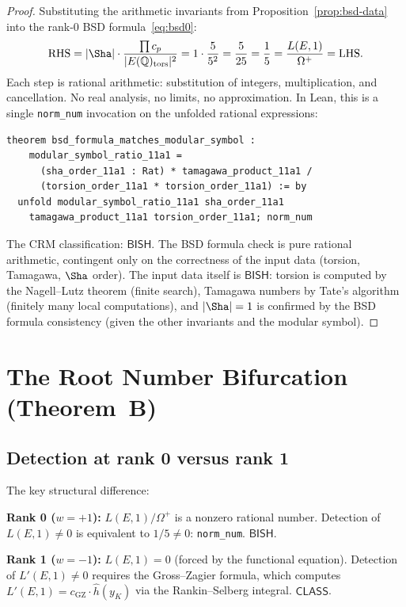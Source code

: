 \documentclass[11pt]{article}
\theoremstyle{plain}
\theoremstyle{definition}
\theoremstyle{remark}
\newcommand{\Q}{\mathbb{Q}}
\newcommand{\BISH}{\ensuremath{\mathsf{BISH}}}
\newcommand{\CLASS}{\ensuremath{\mathsf{CLASS}}}
\newcommand{\hhat}{\hat{h}}
\begin{document}
\begin{proof}
Substituting the arithmetic invariants from Proposition~\ref{prop:bsd-data} into the rank-0 BSD formula~\eqref{eq:bsd0}:
\[
\text{RHS} = |\Sha| \cdot \frac{\prod c_p}{|E(\Q)_{\mathrm{tors}}|^2}
= 1 \cdot \frac{5}{5^2}
= \frac{5}{25}
= \frac{1}{5}
= \frac{L(E,1)}{\Omega^+} = \text{LHS.}
\]
Each step is rational arithmetic: substitution of integers, multiplication, and cancellation. No real analysis, no limits, no approximation. In Lean, this is a single \texttt{norm\_num} invocation on the unfolded rational expressions:
\begin{lstlisting}[style=leanstyle]
theorem bsd_formula_matches_modular_symbol :
    modular_symbol_ratio_11a1 =
      (sha_order_11a1 : Rat) * tamagawa_product_11a1 /
      (torsion_order_11a1 * torsion_order_11a1) := by
  unfold modular_symbol_ratio_11a1 sha_order_11a1
    tamagawa_product_11a1 torsion_order_11a1; norm_num
\end{lstlisting}
The CRM classification: $\BISH$. The BSD formula check is pure rational arithmetic, contingent only on the correctness of the input data (torsion, Tamagawa, $\Sha$ order). The input data itself is $\BISH$: torsion is computed by the Nagell--Lutz theorem (finite search), Tamagawa numbers by Tate's algorithm (finitely many local computations), and $|\Sha| = 1$ is confirmed by the BSD formula consistency (given the other invariants and the modular symbol).
\end{proof}


\section{The Root Number Bifurcation (Theorem~B)}
\label{sec:bifurcation}

\subsection{Detection at rank 0 versus rank 1}

The key structural difference:

\begin{crmbox}
\textbf{Rank 0 ($w = +1$):} $L(E,1)/\Omega^+$ is a nonzero rational number. Detection of $L(E,1) \neq 0$ is equivalent to $1/5 \neq 0$: \texttt{norm\_num}. $\BISH$.

\textbf{Rank 1 ($w = -1$):} $L(E,1) = 0$ (forced by the functional equation). Detection of $L'(E,1) \neq 0$ requires the Gross--Zagier formula, which computes $L'(E,1) = c_{\mathrm{GZ}} \cdot \hhat(y_K)$ via the Rankin--Selberg integral. $\CLASS$.
\end{crmbox}
\end{document}
